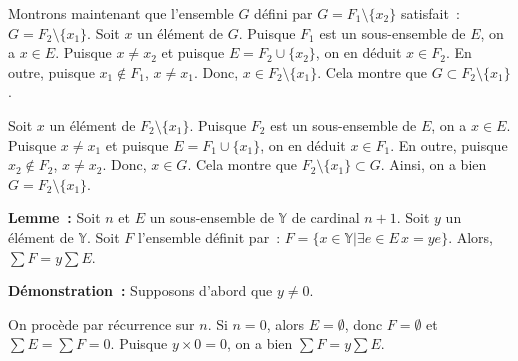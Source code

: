     Montrons maintenant que l'ensemble $G$ défini par $G = F_1 \setminus \lbrace x_2 \rbrace$ satisfait : $G = F_2 \setminus \lbrace x_1 \rbrace$. 
    Soit $x$ un élément de $G$. 
    Puisque $F_1$ est un sous-ensemble de $E$, on a $x \in E$. 
    Puisque $x \neq x_2$ et puisque $E = F_2 \cup \lbrace x_2 \rbrace$, on en déduit $x \in F_2$. 
    En outre, puisque $x_1 \notin F_1$, $x \neq x_1$. 
    Donc, $x \in F_2 \setminus \lbrace x_1 \rbrace$.
    Cela montre que $G \subset F_2 \setminus \lbrace x_1 \rbrace$.
    
    Soit $x$ un élément de $F_2 \setminus \lbrace x_1 \rbrace$.
    Puisque $F_2$ est un sous-ensemble de $E$, on a $x \in E$. 
    Puisque $x \neq x_1$ et puisque $E = F_1 \cup \lbrace x_1 \rbrace$, on en déduit $x \in F_1$. 
    En outre, puisque $x_2 \notin F_2$, $x \neq x_2$. 
    Donc, $x \in G$. 
    Cela montre que $F_2 \setminus \lbrace x_1 \rbrace \subset G$. 
    Ainsi, on a bien $G = F_2 \setminus \lbrace x_1 \rbrace$. 

   \done 

\medskip

\noindent\textbf{Lemme :} Soit $n$ et $E$ un sous-ensemble de $\mathbb{Y}$ de cardinal $n+1$. 
    Soit $y$ un élément de $\mathbb{Y}$.
    Soit $F$ l'ensemble définit par : $F = \lbrace x \in \mathbb{Y} \vert \exists e \in E \, x = y e \rbrace$.
    Alors, $\sum F = y \sum E$.

\medskip

\noindent\textbf{Démonstration :}
    Supposons d'abord que $y \neq 0$.

    On procède par récurrence sur $n$. 
    Si $n = 0$, alors $E = \emptyset$, donc $F = \emptyset$ et $\sum E = \sum F = 0$.
    Puisque $y \times 0 = 0$, on a bien $\sum F = y \sum E$.

